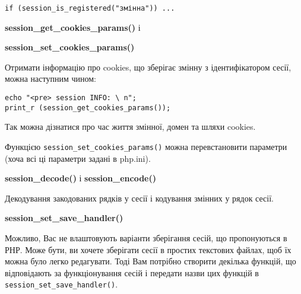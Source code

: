 \verb'if (session_is_registered("змінна")) ...'

\textbf{session\_get\_cookies\_params()} і

\textbf{session\_set\_cookies\_params()}

Отримати інформацію про cookies, що зберігає змінну з ідентифікатором сесії, можна наступним чином:

\begin{verbatim}
echo "<pre> session INFO: \ n";
print_r (session_get_cookies_params());
\end{verbatim}

Так можна дізнатися про час життя змінної, домен та шляхи cookies.

Функцією \verb'session_set_cookies_params()' можна перевстановити параметри (хоча всі ці параметри задані в php.ini).

\textbf{session\_decode()} і \textbf{session\_encode()}

Декодування закодованих рядків у сесії і кодування змінних у рядок сесії.

\textbf{session\_set\_save\_handler()}

Можливо, Вас не влаштовують варіанти зберігання сесій, що пропонуються в РНР. Може бути, ви хочете зберігати сесії в простих текстових файлах, щоб їх можна було легко редагувати. Тоді Вам потрібно створити декілька функцій, що відповідають за функціонування сесій і передати назви цих функцій в \verb'session_set_save_handler()'.
